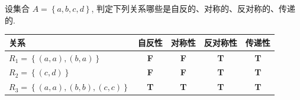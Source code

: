 \documentclass[10pt,UTF8]{book} %
\begin{document}
\begin{exercise}
    设集合 $A = \left\{a,b,c,d\right\}$, 判定下列关系哪些是自反的、对称的、反对称的、传递的.
    {
    \begin{longtable}{p{15em}|cccc}
        \hline
        \textbf{关系} & \textbf{自反性} & \textbf{对称性} & \textbf{反对称性} & \textbf{传递性} \\
        \hline
        \endhead
        \hline
        \endfoot
    
        $R_1 = \left\{ (a,a), (b,a) \right\}$
        & \textbf{F} & \textbf{F} & \textbf{T} & \textbf{T} \\ 
        $R_2 = \left\{ (c,d) \right\}$
        & \textbf{F} & \textbf{F} & \textbf{T} & \textbf{T} \\ 
        $R_3 = \left\{ (a,a), (b,b), (c,c) \right\}$
        & \textbf{T} & \textbf{T} & \textbf{T} & \textbf{T} \\
    \end{longtable}}
\end{exercise}
\end{document}
